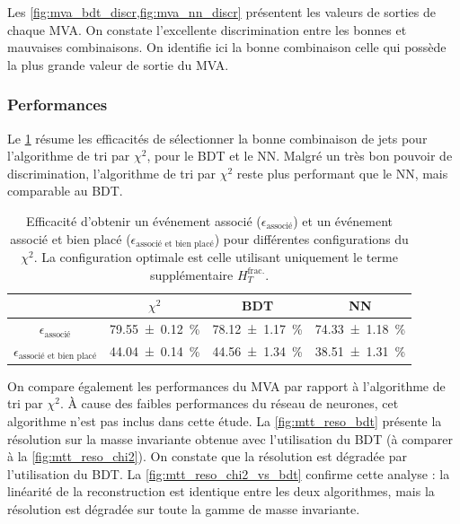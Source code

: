 Les \cref{fig:mva_bdt_discr,fig:mva_nn_discr} présentent les valeurs de sorties de chaque MVA. On constate l'excellente discrimination entre les bonnes et mauvaises combinaisons. On identifie ici la bonne combinaison celle qui possède la plus grande valeur de sortie du MVA.

\subsubsection{Performances}

Le \cref{tab:chi2_vs_bdt_vs_nn} résume les efficacités de sélectionner la bonne combinaison de jets pour l'algorithme de tri par $\chi^2$, pour le BDT et le NN. Malgré un très bon pouvoir de discrimination, l'algorithme de tri par $\chi^2$ reste plus performant que le NN, mais comparable au BDT.

\begin{table}[tbp] \centering
    \begin{tabular}{@{}cccc@{}} \toprule
        & $\chi^2$ & BDT & NN \\ \midrule
        $\epsilon_\text{associé}$ & \SI{79.55 \pm 0.12}{\%} & \SI{78.12 \pm 1.17}{\%} & \SI{74.33 \pm 1.18}{\%} \\
        $\epsilon_\text{associé et bien placé}$ & \SI{44.04 \pm 0.14}{\%} & \SI{44.56 \pm 1.34}{\%} & \SI{38.51 \pm 1.31}{\%} \\ \bottomrule
    \end{tabular}
    \caption{Efficacité d'obtenir un événement associé ($\epsilon_\text{associé}$) et un événement associé et bien placé ($\epsilon_\text{associé et bien placé}$) pour différentes configurations du $\chi^2$. La configuration optimale est celle utilisant uniquement le terme supplémentaire $H_{T}^{\text{frac.}}$.}
    \label{tab:chi2_vs_bdt_vs_nn}
\end{table}


\smallskip

On compare également les performances du MVA par rapport à l'algorithme de tri par $\chi^2$. À cause des faibles performances du réseau de neurones, cet algorithme n'est pas inclus dans cette étude. La \cref{fig:mtt_reso_bdt} présente la résolution sur la masse invariante obtenue avec l'utilisation du BDT (à comparer à la \cref{fig:mtt_reso_chi2}). On constate que la résolution est dégradée par l'utilisation du BDT. La \cref{fig:mtt_reso_chi2_vs_bdt} confirme cette analyse : la linéarité de la reconstruction est identique entre les deux algorithmes, mais la résolution est dégradée sur toute la gamme de masse invariante.

